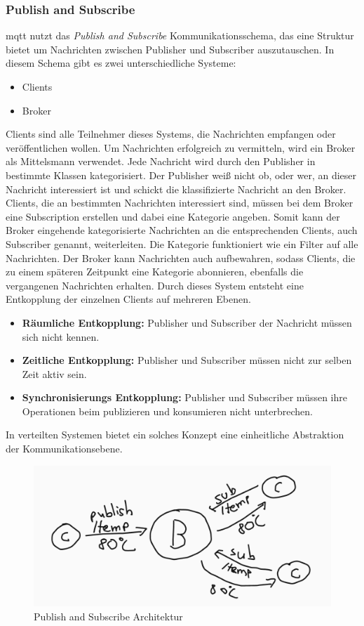 \subsubsection{Publish and Subscribe} \label{s:publish-subscribe}
\ac{mqtt} nutzt das \textit{Publish and Subscribe} Kommunikationsschema, das eine Struktur bietet um Nachrichten zwischen Publisher und Subscriber auszutauschen. In diesem Schema gibt es zwei unterschiedliche Systeme:
\begin{itemize}
    \item Clients
    \item Broker
\end{itemize}
Clients sind alle Teilnehmer dieses Systems, die Nachrichten empfangen oder veröffentlichen wollen. Um Nachrichten erfolgreich zu vermitteln, wird ein Broker als Mittelsmann verwendet.\cite{teamGettingStartedMQTT}
Jede Nachricht wird durch den Publisher in bestimmte Klassen kategorisiert. Der Publisher wei{\ss} nicht ob, oder wer, an dieser Nachricht interessiert ist und schickt die klassifizierte Nachricht an den Broker.
Clients, die an bestimmten Nachrichten interessiert sind, müssen bei dem Broker eine Subscription erstellen und dabei eine Kategorie angeben.
Somit kann der Broker eingehende kategorisierte Nachrichten an die entsprechenden Clients, auch Subscriber genannt, weiterleiten. Die Kategorie funktioniert wie ein Filter auf alle Nachrichten.
Der Broker kann Nachrichten auch aufbewahren, sodass Clients, die zu einem späteren Zeitpunkt eine Kategorie abonnieren, ebenfalls die vergangenen Nachrichten erhalten.
\cite{EverythingYouNeed}
Durch dieses System entsteht eine Entkopplung der einzelnen Clients auf mehreren Ebenen.
\begin{itemize}
    \item \textbf{Räumliche Entkopplung:} Publisher und Subscriber der Nachricht müssen sich nicht kennen.
    \item \textbf{Zeitliche Entkopplung:} Publisher und Subscriber müssen nicht zur selben Zeit aktiv sein.
    \item \textbf{Synchronisierungs Entkopplung:} Publisher und Subscriber müssen ihre Operationen beim publizieren und konsumieren nicht unterbrechen.
\end{itemize}
\cite{teamPublishSubscribeMQTT}
In verteilten Systemen bietet ein solches Konzept eine einheitliche Abstraktion der Kommunikationsebene.
\cite{domingusDistributedSystemsIntroduction2020}
\begin{figure}
    \centering
    \includegraphics[scale=0.5]{images/publish_subscribe.png}
    \caption{Publish and Subscribe Architektur}
    \label{fig:publish-subscribe}
\end{figure}
